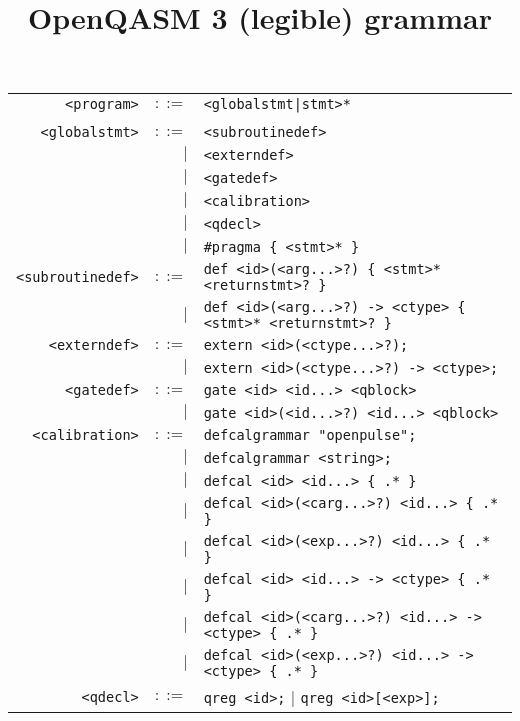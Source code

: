 \documentclass[notitlepage]{article}
\title{OpenQASM 3 (legible) grammar}
\date{\vspace{-10ex}}
\begin{document}
\maketitle

\begin{longtable}{rrl}
	\texttt{<program>} & $::=$ & \texttt{<globalstmt|stmt>*} \\ \\
	\texttt{<globalstmt>} & $::=$ & \texttt{<subroutinedef>} \\
	    & $\mid$ & \texttt{<externdef>} \\
	    & $\mid$ & \texttt{<gatedef>} \\
	    & $\mid$ & \texttt{<calibration>} \\
	    & $\mid$ & \texttt{<qdecl>} \\
	    & $\mid$ & \texttt{\#pragma \{ <stmt>* \}} \\
	\texttt{<subroutinedef>} & $::=$ & \texttt{def <id>(<arg...>?) \{ <stmt>* <returnstmt>? \}} \\
	    & $\mid$ & \texttt{def <id>(<arg...>?) -> <ctype> \{ <stmt>* <returnstmt>? \}} \\
	\texttt{<externdef>} & $::=$ & \texttt{extern <id>(<ctype...>?);} \\
	    & $\mid$ & \texttt{extern <id>(<ctype...>?) -> <ctype>;} \\
	\texttt{<gatedef>} & $::=$ & \texttt{gate <id> <id...> <qblock>} \\
	    & $\mid$ & \texttt{gate <id>(<id...>?) <id...> <qblock>} \\
	\texttt{<calibration>} & $::=$ & \texttt{defcalgrammar "openpulse";} \\
	    & $\mid$ & \texttt{defcalgrammar <string>;} \\
	    & $\mid$ & \texttt{defcal <id> <id...> \{ .* \}} \\
	    & $\mid$ & \texttt{defcal <id>(<carg...>?) <id...> \{ .* \}} \\
	    & $\mid$ & \texttt{defcal <id>(<exp...>?) <id...> \{ .* \}} \\
	    & $\mid$ & \texttt{defcal <id> <id...> -> <ctype> \{ .* \}} \\
	    & $\mid$ & \texttt{defcal <id>(<carg...>?) <id...> -> <ctype> \{ .* \}} \\
	    & $\mid$ & \texttt{defcal <id>(<exp...>?) <id...> -> <ctype> \{ .* \}} \\
	\texttt{<qdecl>} & $::=$ & \texttt{qreg <id>;} $\mid$ \texttt{qreg <id>[<exp>];} \\

\end{longtable}
\end{document}
